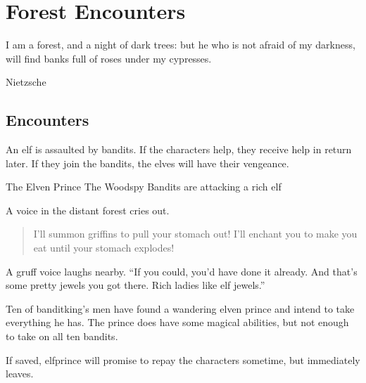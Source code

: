\chapter{Forest Encounters}

\epigraph{I am a forest, and a night of dark trees: but he who is not afraid of my darkness, will find banks full of roses under my cypresses.}{Nietzsche}

\renewcommand{\sqarea}{Forest}

\setcounter{enc}{0}

\section{Encounters}

\begin{multicols}{2}

\label{littleprince}

\startcontents[sq]

\sqminitoc

\noindent
An elf is assaulted by bandits.
If the characters help, they receive help in return later.
If they join the bandits, the elves will have their vengeance.

{The Elven Prince}%
{The Woodspy Bandits are attacking a rich elf}%

\begin{boxtext}
	A voice in the distant forest cries out.
	\begin{quote}
		I'll summon griffins to pull your stomach out!  I'll enchant you to make you eat until your stomach explodes!
	\end{quote}

	A gruff voice laughs nearby.  ``If you could, you'd have done it already.  And that's some pretty jewels you got there.  Rich ladies like elf jewels.''

\end{boxtext}

Ten of \gls{banditking}'s men have found a wandering elven prince and intend to take everything he has.
The prince does have some magical abilities, but not enough to take on all ten bandits.


\elfprince

If saved, \gls{elfprince} will promise to repay the characters sometime, but immediately leaves.


\end{multicols}
